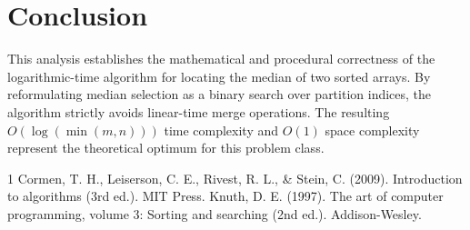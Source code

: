 \documentclass[10pt,journal,compsoc]{IEEEtran}
\begin{document}
\section{Conclusion}
This analysis establishes the mathematical and procedural correctness of the logarithmic-time algorithm for locating the median of two sorted arrays. By reformulating median selection as a binary search over partition indices, the algorithm strictly avoids linear-time merge operations. The resulting $O(\log(\min(m, n)))$ time complexity and $O(1)$ space complexity represent the theoretical optimum for this problem class.

\begin{thebibliography}{1}
 Cormen, T. H., Leiserson, C. E., Rivest, R. L., \& Stein, C. (2009). Introduction to algorithms (3rd ed.). MIT Press.
 Knuth, D. E. (1997). The art of computer programming, volume 3: Sorting and searching (2nd ed.). Addison-Wesley.
\end{thebibliography}
\end{document}
